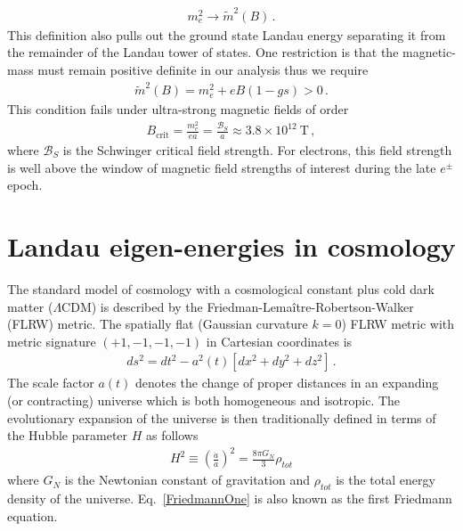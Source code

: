 \documentclass[Universe,article,submit,moreauthors,pdftex]{Definitions/mdpi}
\newcommand*{\req}[1]{Eq.~{\eqref{#1}}}
\begin{document}
\begin{align}
  \label{MagMass} m_{e}^{2}\rightarrow\tilde{m}^2(B)\,.
\end{align}
This definition also pulls out the ground state Landau energy separating it from the remainder of the Landau tower of states. One restriction is that the magnetic-mass must remain positive definite in our analysis thus we require
\begin{align}
  \label{MassLimit} \tilde{m}^2(B)=m^2_e+eB\left(1-gs\right)>0\,.
\end{align}
This condition fails under ultra-strong magnetic fields of order
\begin{align}
  \label{MagMassFail} B_{\mathrm{crit}}=\frac{m_{e}^{2}}{ea}=\frac{\mathcal{B}_{S}}{a}\approx3.8\times10^{12}\ \mathrm{T}\,,
\end{align}
where $\mathcal{B}_{S}$ is the Schwinger critical field strength. For electrons, this field strength is well above the window of magnetic field strengths of interest during the late $e^{\pm}$ epoch.

\section{Landau eigen-energies in cosmology}
\noindent The standard model of cosmology with a cosmological constant plus cold dark matter ($\Lambda\mathrm{CDM}$) is described by the Friedman-Lemaître-Robertson-Walker (FLRW) metric. The spatially flat (Gaussian curvature $k=0$) FLRW metric with metric signature $(+1,-1,-1,-1)$ in Cartesian coordinates is
\begin{align}
    \label{FLRW} ds^2=dt^2-a^2(t)\left[dx^2+dy^2+dz^2\right]\,.
\end{align}
The scale factor $a(t)$ denotes the change of proper distances in an expanding (or contracting) universe which is both homogeneous and isotropic. The evolutionary expansion of the universe is then traditionally defined in terms of the Hubble parameter $H$ as follows
\begin{align}
    \label{FriedmannOne}H^2\equiv\left(\frac{\dot a}{a}\right)^2=\frac{8\pi G_N}{3}\rho_{tot}
\end{align}
where $G_N$ is the Newtonian constant of gravitation and $\rho_{tot}$ is the total energy density of the universe. \req{FriedmannOne} is also known as the first Friedmann equation. 
\end{document}
